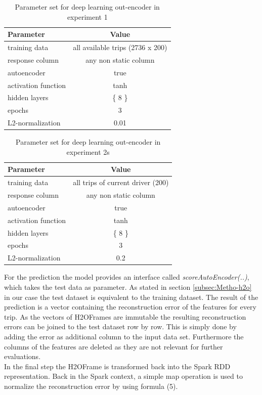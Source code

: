 \documentclass{vldb}
\begin{document}
\begin{table}
\centering
\begin{tabular}{l | c}
Parameter            & Value\\ \hline
training data        & all available trips (2736 x 200) \\
response column      & any non static column \\
autoencoder          & true \\
activation function  & tanh \\
hidden layers        & \{ 8 \}\\
epochs               & 3\\
L2-normalization     & 0.01
\end{tabular}
\caption{Parameter set for deep learning out-encoder in experiment 1}
\label{table:param-set-exp1}
\end{table}

\begin{table}
\centering
\begin{tabular}{l | c}
Parameter            & Value\\ \hline
training data        & all trips of current driver (200) \\
response column      & any non static column \\
autoencoder          & true \\
activation function  & tanh \\
hidden layers        & \{ 8 \}\\
epochs               & 3\\
L2-normalization     & 0.2
\end{tabular}
\caption{Parameter set for deep learning out-encoder in experiment 2s}
\label{table:param-set-exp2}
\end{table}

For the prediction the model provides an interface called \textit{scoreAutoEncoder(..)}, which takes the test data as parameter. As stated in section \ref{subsec:Metho-h2o} in our case the test dataset is equivalent to the training dataset. The result of the prediction is a vector containing the reconstruction error of the features for every trip. As the vectors of H2OFrames are immutable the resulting reconstruction errors can be joined to the test dataset row by row. This is simply done by adding the error as additional column to the input data set. Furthermore the columns of the features are deleted as they are not relevant for further evaluations. \\
In the final step the H2OFrame is transformed back into the Spark RDD representation. Back in the Spark context,  a simple map operation is used to  normalize the reconstruction error by using formula (5).
\end{document}
